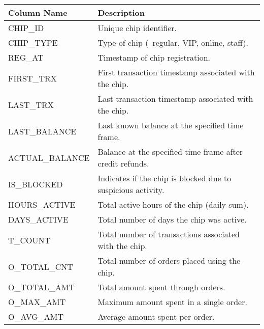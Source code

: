 \begin{table}[h]
	\centering
	\footnotesize
	\begin{tabularx}{\textwidth}{|>{\columncolor{unicorn_blue!5}}X|>{\columncolor{unicorn_blue!5}}l|}
		\hline
		\rowcolor{unicorn_blue}
		\textbf{\color{white} Column Name} & \textbf{\color{white} Description}                           \\
		\hline
		\hline
		CHIP\_ID                             & Unique chip identifier.                                      \\
		CHIP\_TYPE                           & Type of chip (\eg~regular, VIP, online, staff).              \\
		REG\_AT                              & Timestamp of chip registration.                              \\
		FIRST\_TRX                           & First transaction timestamp associated with the chip.        \\
		LAST\_TRX                            & Last transaction timestamp associated with the chip.         \\
		LAST\_BALANCE                        & Last known balance at the specified time frame.              \\
		ACTUAL\_BALANCE                      & Balance at the specified time frame after credit refunds.    \\
		\hline
		IS\_BLOCKED                          & Indicates if the chip is blocked due to suspicious activity. \\
		HOURS\_ACTIVE                        & Total active hours of the chip (daily sum).                  \\
		DAYS\_ACTIVE                         & Total number of days the chip was active.                    \\
		\hline
		T\_COUNT                             & Total number of transactions associated with the chip.       \\
		O\_TOTAL\_CNT                        & Total number of orders placed using the chip.                \\
		O\_TOTAL\_AMT                        & Total amount spent through orders.                           \\
		O\_MAX\_AMT                          & Maximum amount spent in a single order.                      \\
		O\_AVG\_AMT                          & Average amount spent per order.                              \\

\end{tabularx}
\end{table}
